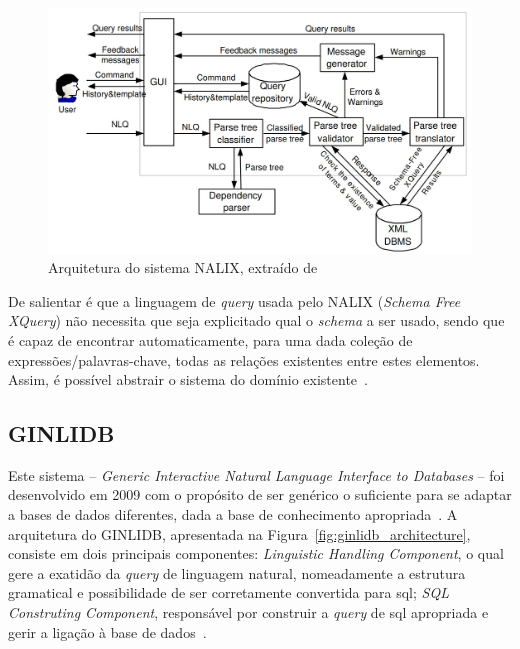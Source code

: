 \begin{figure}[!ht]
    \centering
    \includegraphics[width=.7\textwidth]{ch03/assets/nalix_architecture.jpg}
    \caption{Arquitetura do sistema NALIX, extraído de~\textcite{nalix_interactive_nli_querying_xml}}
    \label{fig:nalix_architecture}
\end{figure}

De salientar é que a linguagem de \textit{query} usada pelo NALIX (\textit{Schema Free XQuery}) não necessita que seja explicitado qual o \textit{schema} a ser usado, sendo que é capaz de encontrar automaticamente, para uma dada coleção de expressões/palavras-chave, todas as relações existentes entre estes elementos. Assim, é possível abstrair o sistema do domínio existente~\parencite{nalix_interactive_nli_querying_xml, survey_nlidb}.

\subsection{GINLIDB}
Este sistema -- \textit{Generic Interactive Natural Language Interface to Databases} -- foi desenvolvido em 2009 com o propósito de ser genérico o suficiente para se adaptar a bases de dados diferentes, dada a base de conhecimento apropriada~\parencite{ginlidb}. A arquitetura do GINLIDB, apresentada na Figura~\ref{fig:ginlidb_architecture}, consiste em dois principais componentes: \textit{Linguistic Handling Component}, o qual gere a exatidão da \textit{query} de linguagem natural, nomeadamente a estrutura gramatical e possibilidade de ser corretamente convertida para \gls{sql}; \textit{SQL Construting Component}, responsável por construir a \textit{query} de \gls{sql} apropriada e gerir a ligação à base de dados~\parencite{ginlidb}.

